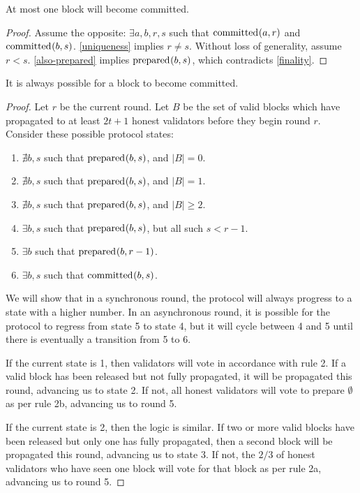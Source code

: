 \begin{theorem}[Safety]
  At most one block will become committed.
\end{theorem}

\begin{proof}
  Assume the opposite: $\exists a, b, r, s$ such that $\operatorname{committed}_{}(a, r)$ and $\operatorname{committed}_{}(b, s)$. \autoref{uniqueness} implies $r \ne s$. Without loss of generality, assume $r < s$. \autoref{also-prepared} implies $\operatorname{prepared}_{}(b, s)$, which contradicts \autoref{finality}.
\end{proof}

\begin{theorem}[Liveness]
  It is always possible for a block to become committed.
\end{theorem}

\begin{proof}
  Let $r$ be the current round. Let $B$ be the set of valid blocks which have propagated to at least $2t + 1$ honest validators before they begin round $r$. Consider these possible protocol states:
  \begin{enumerate}
    \item $\nexists b, s$ such that $\operatorname{prepared}_{}(b, s)$, and $|B| = 0$.
    \item $\nexists b, s$ such that $\operatorname{prepared}_{}(b, s)$, and $|B| = 1$.
    \item $\nexists b, s$ such that $\operatorname{prepared}_{}(b, s)$, and $|B| \ge 2$.
    \item $\exists b, s$ such that $\operatorname{prepared}_{}(b, s)$, but all such $s < r - 1$.
    \item $\exists b$ such that $\operatorname{prepared}_{}(b, r - 1)$.
    \item $\exists b, s$ such that $\operatorname{committed}_{}(b, s)$.
  \end{enumerate}
  We will show that in a synchronous round, the protocol will always progress to a state with a higher number. In an asynchronous round, it is possible for the protocol to regress from state 5 to state 4, but it will cycle between 4 and 5 until there is eventually a transition from 5 to 6.

  If the current state is 1, then validators will vote in accordance with rule 2. If a valid block has been released but not fully propagated, it will be propagated this round, advancing us to state 2. If not, all honest validators will vote to prepare $\emptyset$ as per rule 2b, advancing us to round 5.

  If the current state is 2, then the logic is similar. If two or more valid blocks have been released but only one has fully propagated, then a second block will be propagated this round, advancing us to state 3. If not, the $2/3$ of honest validators who have seen one block will vote for that block as per rule 2a, advancing us to round 5.


\end{proof}
